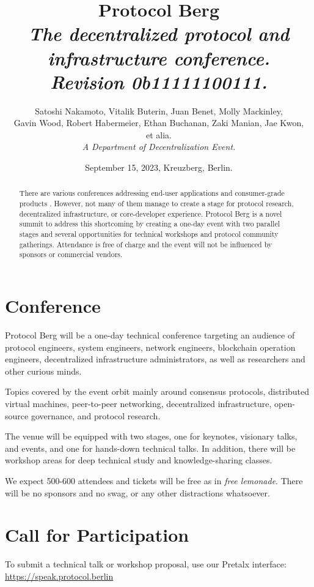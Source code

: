 \documentclass[a4paper,12pt]{article}
\title{\huge \textbf{Protocol Berg}\\[.5em]
    \large \textit{The decentralized protocol and infrastructure conference.\\
     Revision 0b11111100111.}}
\author{Satoshi Nakamoto, Vitalik Buterin, Juan Benet, Molly Mackinley,\\
    Gavin Wood, Robert Habermeier, Ethan Buchanan, Zaki Manian, Jae Kwon,\\
    et alia.\\[1em]\textit{A Department of Decentralization \cite{dod} Event.}}
\date{September 15, 2023, Kreuzberg, Berlin.}
\begin{document}
  \maketitle

  \begin{abstract}
    There are various conferences addressing end-user applications and consumer-grade products
    \cite{dapp}\cite{desci}\cite{bbw}.
    However, not many of them manage to create a stage for protocol research, decentralized
    infrastructure, or core-developer experience. Protocol Berg is a novel summit to address this
    shortcoming by creating a one-day event with two parallel stages and several opportunities for
    technical workshops and protocol community gatherings. Attendance is free of charge and the
    event will not be influenced by sponsors or commercial vendors.
  \end{abstract}

  \section{Conference}
  Protocol Berg will be a one-day technical conference targeting an audience of protocol engineers,
  system engineers, network engineers, blockchain operation engineers, decentralized
  infrastructure administrators, as well as researchers and other curious minds.

  Topics covered by the event orbit mainly around consensus protocols, distributed virtual
  machines, peer-to-peer networking, decentralized infrastructure, open-source governance, and
  protocol research.

  The venue will be equipped with two stages, one for keynotes, visionary talks, and events, and
  one for hands-down technical talks. In addition, there will be workshop areas for deep technical
  study and knowledge-sharing classes.

  We expect 500-600 attendees and tickets will be free as in \textit{free lemonade}. There will
  be no sponsors and no swag, or any other distractions whatsoever.

  \section{Call for Participation}
  To submit a technical talk or workshop proposal, use our Pretalx interface:\\
  \hspace*{3em}\url{https://speak.protocol.berlin}
\end{document}
